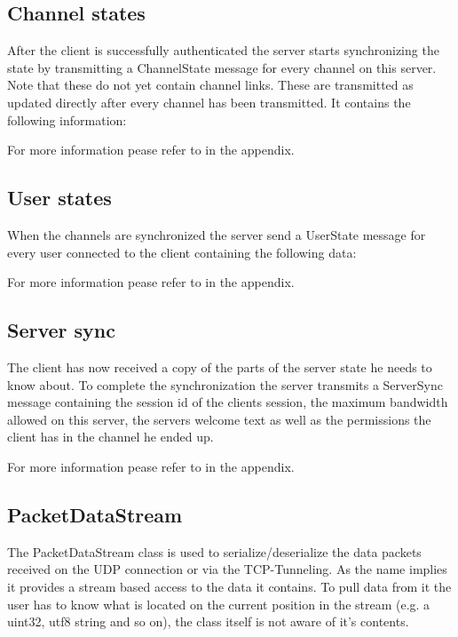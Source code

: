 \documentclass[11pt]{article} %
\begin{document}
\subsection{Channel states}

After the client is successfully authenticated the server starts synchronizing the state by transmitting a ChannelState message for every channel on this server. Note that these do not yet contain channel links. These are transmitted as updated directly after every channel has been transmitted. It contains the following information:

For more information pease refer to  in the appendix.

\subsection{User states}

When the channels are synchronized the server send a UserState message for every user connected to the client containing the following data:

For more information pease refer to  in the appendix.

\subsection {Server sync}
The client has now received a copy of the parts of the server state he needs to know about. To complete the synchronization the server transmits a ServerSync message containing the session id of the clients session, the maximum bandwidth allowed on this server, the servers welcome text as well as the permissions the client has in the channel he ended up.

For more information pease refer to  in the appendix.

\subsection {PacketDataStream}
The PacketDataStream class is used to serialize/deserialize the data packets received on the UDP connection or via the TCP-Tunneling. As the name implies it provides a stream based access to the data it contains. To pull data from it the user has to know what is located on the current position in the stream (e.g. a uint32, utf8 string and so on), the class itself is not aware of it's contents.
\end{document}
